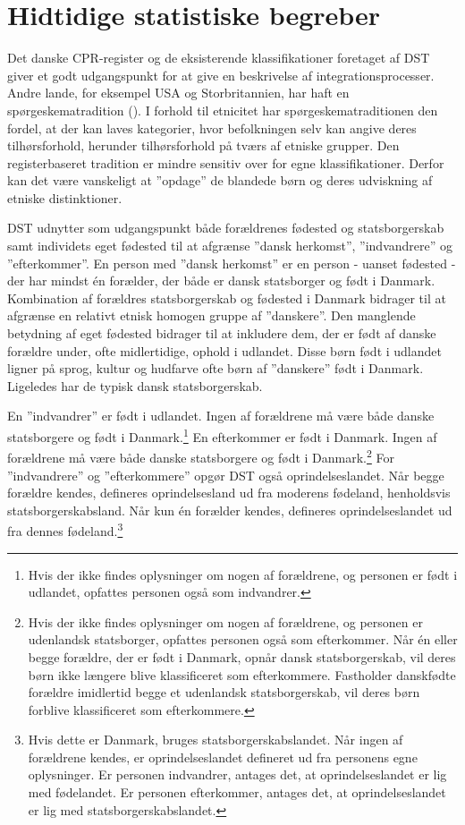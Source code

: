 \documentclass[
]{book}
\begin{document}
\section{Hidtidige statistiske begreber}\label{hidtidige-statistiske-begreber}

Det danske CPR-register og de eksisterende klassifikationer foretaget af DST giver et godt udgangspunkt for at give en beskrivelse af integrationsprocesser. Andre lande, for eksempel USA og Storbritannien, har haft en spørgeskematradition (). I forhold til etnicitet har spørgeskematraditionen den fordel, at der kan laves kategorier, hvor befolkningen selv kan angive deres tilhørsforhold, herunder tilhørsforhold på tværs af etniske grupper. Den registerbaseret tradition er mindre sensitiv over for egne klassifikationer. Derfor kan det være vanskeligt at ''opdage'' de blandede børn og deres udviskning af etniske distinktioner.

DST udnytter som udgangspunkt både forældrenes fødested og statsborgerskab samt individets eget fødested til at afgrænse ''dansk herkomst'', ''indvandrere'' og ''efterkommer''. En person med ''dansk herkomst'' er en person - uanset fødested - der har mindst én forælder, der både er dansk statsborger og født i Danmark. Kombination af forældres statsborgerskab og fødested i Danmark bidrager til at afgrænse en relativt etnisk homogen gruppe af ''danskere''. Den manglende betydning af eget fødested bidrager til at inkludere dem, der er født af danske forældre under, ofte midlertidige, ophold i udlandet. Disse børn født i udlandet ligner på sprog, kultur og hudfarve ofte børn af ''danskere'' født i Danmark. Ligeledes har de typisk dansk statsborgerskab.

En ''indvandrer'' er født i udlandet. Ingen af forældrene må være både danske statsborgere og født i Danmark.\footnote{Hvis der ikke findes oplysninger om nogen af forældrene, og personen er født i udlandet, opfattes personen også som indvandrer.} En efterkommer er født i Danmark. Ingen af forældrene må være både danske statsborgere og født i Danmark.\footnote{Hvis der ikke findes oplysninger om nogen af forældrene, og personen er udenlandsk statsborger, opfattes personen også som efterkommer. Når én eller begge forældre, der er født i Danmark, opnår dansk statsborgerskab, vil deres børn ikke længere blive klassificeret som efterkommere. Fastholder danskfødte forældre imidlertid begge et udenlandsk statsborgerskab, vil deres børn forblive klassificeret som efterkommere.} For ''indvandrere'' og ''efterkommere'' opgør DST også oprindelseslandet. Når begge forældre kendes, defineres oprindelsesland ud fra moderens fødeland, henholdsvis statsborgerskabsland. Når kun én forælder kendes, defineres oprindelseslandet ud fra dennes fødeland.\footnote{Hvis dette er Danmark, bruges statsborgerskabslandet. Når ingen af forældrene kendes, er oprindelseslandet defineret ud fra personens egne oplysninger. Er personen indvandrer, antages det, at oprindelseslandet er lig med fødelandet. Er personen efterkommer, antages det, at oprindelseslandet er lig med statsborgerskabslandet.}
\end{document}
